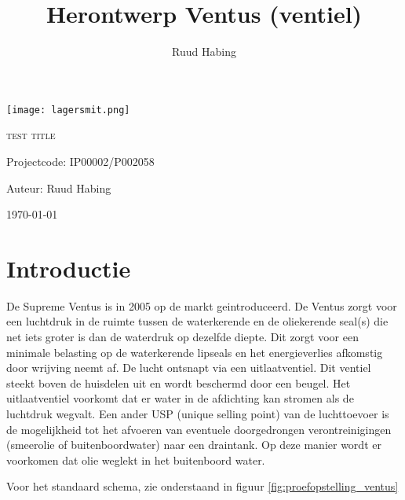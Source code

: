 \documentclass[11pt,a4paper,twoside]{report}
\author{Ruud Habing}
\title{Herontwerp Ventus (ventiel)}
\begin{document}
\begin{titlepage}
	\centering
	\texttt{[image: lagersmit.png]}\par
		
	{\scshape\huge test title\par}
     
    Projectcode: IP00002/P002058
    
	\vspace{2cm}
	\vspace{1cm}
	{\Large Auteur: Ruud Habing\par}


	{\large \today\par}
\end{titlepage}

\tableofcontents
\newpage

\chapter{Introductie}

De Supreme Ventus is in 2005 op de markt geintroduceerd. De Ventus zorgt voor een luchtdruk in de ruimte tussen de waterkerende en de oliekerende seal(s) die net iets groter is dan de waterdruk op dezelfde diepte. Dit zorgt voor een minimale belasting op de waterkerende lipseals en het energieverlies afkomstig door wrijving neemt af. De lucht ontsnapt via een uitlaatventiel. Dit ventiel steekt boven de huisdelen uit en wordt beschermd door een beugel. Het uitlaatventiel voorkomt dat er water in de afdichting kan stromen als de luchtdruk wegvalt. Een ander USP (unique selling point) van de luchttoevoer is de mogelijkheid tot het afvoeren van eventuele doorgedrongen verontreinigingen (smeerolie of buitenboordwater) naar een draintank. Op deze manier wordt er voorkomen dat olie weglekt in het buitenboord water. 

Voor het standaard schema, zie onderstaand in figuur \ref{fig:proefopstelling_ventus}
\end{document}
